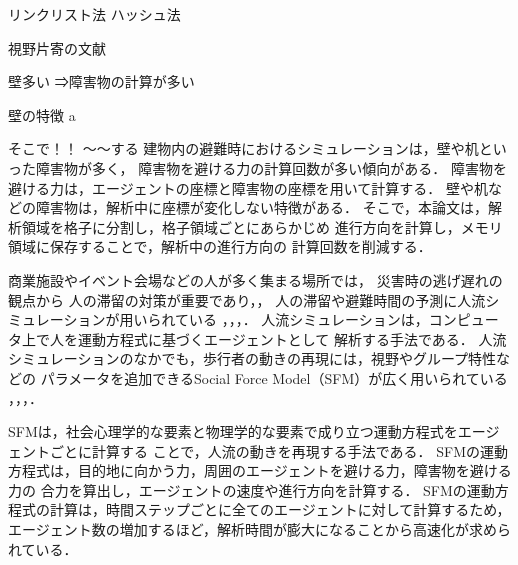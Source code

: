 リンクリスト法\cite{cell_book1}\cite{cell_book}\cite{cellrenketu}
ハッシュ法\cite{hash}

視野片寄の文献\cite{katayose}

壁多い
⇒障害物の計算が多い

壁の特徴
a

そこで！！
～～する
\fi
建物内の避難時におけるシミュレーションは，壁や机といった障害物が多く，
障害物を避ける力の計算回数が多い傾向がある．
障害物を避ける力は，エージェントの座標と障害物の座標を用いて計算する．
壁や机などの障害物は，解析中に座標が変化しない特徴がある．
そこで，本論文は，解析領域を格子に分割し，格子領域ごとにあらかじめ
進行方向を計算し，メモリ領域に保存することで，解析中の進行方向の
計算回数を削減する．


商業施設やイベント会場などの人が多く集まる場所では，
災害時の逃げ遅れの観点から
人の滞留の対策が重要であり\cite{taisaku1}，\cite{taisaku2}，
人の滞留や避難時間の予測に人流シミュレーションが用いられている
\cite{sim_jirei1}，\cite{sim_jirei2}，\cite{sim_jirei3}，\cite{sim_jirei8}．
人流シミュレーションは，コンピュータ上で人を運動方程式に基づくエージェントとして
解析する手法である．
人流シミュレーションのなかでも，歩行者の動きの再現には，視野やグループ特性などの
パラメータを追加できるSocial Force Model（SFM）が広く用いられている
\cite{helbing_sfm}，\cite{sfm_ntt}，\cite{sfm_para1}，\cite{intro_gunshu}．

SFMは，社会心理学的な要素と物理学的な要素で成り立つ運動方程式をエージェントごとに計算する
ことで，人流の動きを再現する手法である．
SFMの運動方程式は，目的地に向かう力，周囲のエージェントを避ける力，障害物を避ける力の
合力を算出し，エージェントの速度や進行方向を計算する．
SFMの運動方程式の計算は，時間ステップごとに全てのエージェントに対して計算するため，
エージェント数の増加するほど，解析時間が膨大になることから高速化が求められている．

